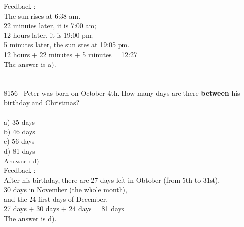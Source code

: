 \documentclass[letterpaper, 12pt]{article}
\begin{document}
Feedback :\\
The sun rises at 6:38 am.\\
22 minutes later, it is 7:00 am;\\
12 hours later, it is 19:00 pm;\\
5 minutes later, the sun stes at 19:05 pm.\\
12 hours + 22 minutes + 5 minutes = 12:27\\
The answer is a$)$.\\
\\
\\
8156-- Peter was born on October 4th. How many days are there \textbf{between} his birthday and Christmas?\\
\\
a) 35 days\\
b) 46 days\\
c) 56 days\\
d) 81 days\\

Answer : d$)$\\

Feedback :\\
After his birthday, there are 27 days left in Obtober (from 5th to 31st),\\
30 days in November (the whole month),\\
and the 24 first days of December.\\
27 days + 30 days + 24 days = 81 days\\
The answer is d$)$.\\
\end{document}
